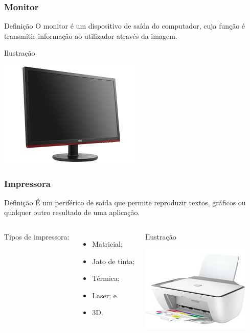 \documentclass[aspectratio=169]{beamer} %
\begin{document}
\begin{frame}
	\frametitle{Monitor}
	
	\begin{block}{Defini\c cão}
		O monitor é um dispositivo de saída do computador, cuja função é transmitir informação ao utilizador através da imagem.
	\end{block}\vfill
	
	\begin{exampleblock}{Ilustra\c cão}
		\begin{center}
			\includegraphics[scale=0.4]{img/monitor}
		\end{center}		
	\end{exampleblock}
\end{frame}

\begin{frame}
	\frametitle{Impressora}
	
	\begin{block}{Defini\c cão}
		É um periférico de saída que permite reproduzir textos, gráficos ou qualquer outro resultado de uma aplicação.
	\end{block}\vfill	
	
	\begin{columns}
		Tipos de impressora:
		\begin{itemize}
			\item Matricial;
			\item Jato de tinta;
			\item Térmica;
			\item Laser; e
			\item 3D.
		\end{itemize}


		\begin{exampleblock}{Ilustra\c cão}
			\begin{center}
				\includegraphics[scale=0.5]{img/impressora}
			\end{center}		
		\end{exampleblock}
	\end{columns}
\end{frame}
\end{document}
